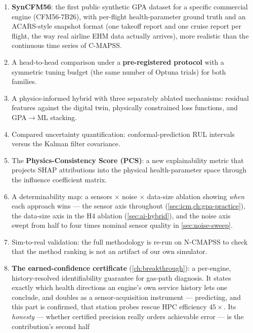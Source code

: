 \begin{enumerate}
  \item[\textbf{C1.}] \textbf{SynCFM56}: the first public synthetic GPA dataset for a specific
    commercial engine (CFM56-7B26), with per-flight health-parameter ground truth and an
    ACARS-style snapshot format (one takeoff report and one cruise report per flight, the way
    real airline EHM data actually arrives), more realistic than the continuous time series of
    C-MAPSS.
  \item[\textbf{C2.}] A head-to-head comparison under a \textbf{pre-registered protocol} with a
    symmetric tuning budget (the same number of Optuna trials) for both families.
  \item[\textbf{C3.}] A physics-informed hybrid with three separately ablated mechanisms:
    residual features against the digital twin, physically constrained loss functions, and
    GPA$\rightarrow$ML stacking.
  \item[\textbf{C4.}] Compared uncertainty quantification: conformal-prediction RUL intervals
    versus the Kalman filter covariance.
  \item[\textbf{C5.}] The \textbf{Physics-Consistency Score (PCS)}: a new explainability metric
    that projects SHAP attributions into the physical health-parameter space through the
    influence coefficient matrix.
  \item[\textbf{C6.}] A determinability map: a sensors $\times$ noise $\times$ data-size
    ablation showing \emph{when} each approach wins --- the sensor axis throughout
    (\cref{sec:icm,ch:gpa-practice}), the data-size axis in the H4 ablation
    (\cref{sec:ai-hybrid}), and the noise axis swept from half to four times nominal sensor
    quality in \cref{sec:noise-sweep}.
  \item[\textbf{C7.}] Sim-to-real validation: the full methodology is re-run on N-CMAPSS to
    check that the method ranking is not an artifact of our own simulator.
  \item[\textbf{C8.}] \textbf{The earned-confidence certificate} (\cref{ch:breakthrough}): a
    per-engine, history-resolved identifiability guarantee for gas-path diagnosis. It states
    exactly which health directions an engine's own service history lets one conclude, and
    doubles as a sensor-acquisition instrument --- predicting, and this part is confirmed,
    that station probes rescue HPC efficiency $45\times$. Its \emph{honesty} --- whether
    certified precision really orders achievable error --- is the contribution's second half

\end{enumerate}
